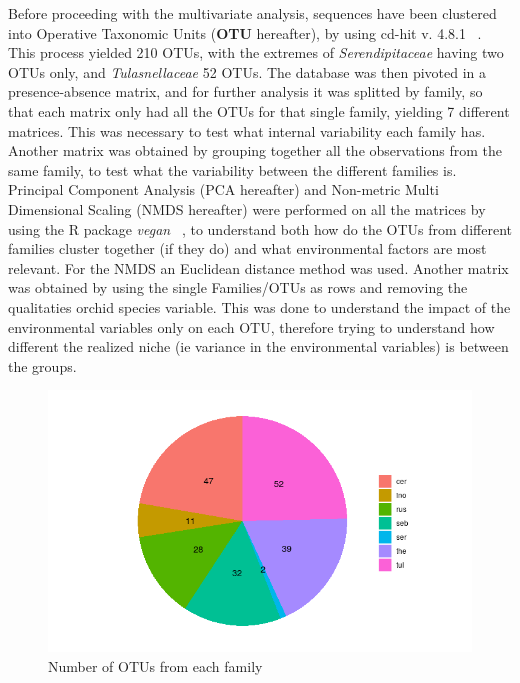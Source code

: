 Before proceeding with the multivariate analysis, sequences have been clustered into Operative Taxonomic Units (\textbf{OTU} hereafter), by using cd-hit v. 4.8.1 ~\citep{li2001}. This process yielded 210 OTUs, with the extremes of \emph{Serendipitaceae} having two OTUs only, and \emph{Tulasnellaceae} 52 OTUs.
The database was then pivoted in a presence-absence matrix, and for further analysis it was splitted by family, so that each matrix only had all the OTUs for that single family, yielding 7 different matrices. This was necessary to test what internal variability each family has. Another matrix was obtained by grouping together all the observations from the same family, to test what the variability between the different families is.
Principal Component Analysis (PCA hereafter) and Non-metric Multi Dimensional Scaling (NMDS hereafter) were performed on all the matrices by using the R package \emph{vegan} ~\citep{dixon2003a}, to understand both how do the OTUs from different families cluster together (if they do) and what environmental factors are most relevant. For the NMDS an Euclidean distance method was used.
Another matrix was obtained by using the single Families\slash OTUs as rows and removing the qualitaties orchid species variable. This was done to understand the impact of the environmental variables only on each OTU, therefore trying to understand how different the realized niche (ie variance in the environmental variables) is between the groups.

\begin{figure}[htbp]
\centering
\includegraphics[keepaspectratio,width=\textwidth,height=0.75\textheight]{images/clust.png}
\caption{Number of OTUs from each family}
\end{figure}

